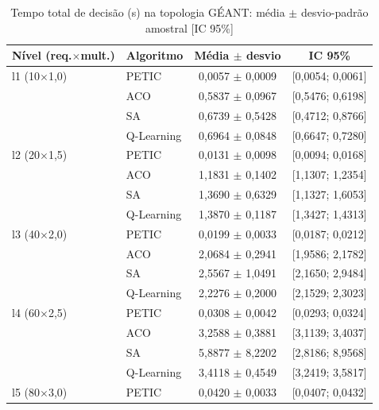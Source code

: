 \begin{table}[htb]
    \centering
    \small
    \caption{Tempo total de decisão (s) na topologia GÉANT: média $\pm$ desvio-padrão amostral [IC 95\%]}
    \label{tab:tempo-geant}
    \begin{tabular}{llcc}
        \hline
        Nível (req.$\times$mult.) & Algoritmo & Média $\pm$ desvio & IC 95\% \\
        \hline
        l1 (10$\times$1,0) & PETIC & 0,0057 $\pm$ 0,0009 & [0,0054; 0,0061] \\
         & ACO & 0,5837 $\pm$ 0,0967 & [0,5476; 0,6198] \\
         & SA & 0,6739 $\pm$ 0,5428 & [0,4712; 0,8766] \\
         & Q-Learning & 0,6964 $\pm$ 0,0848 & [0,6647; 0,7280] \\
        \hline
        l2 (20$\times$1,5) & PETIC & 0,0131 $\pm$ 0,0098 & [0,0094; 0,0168] \\
         & ACO & 1,1831 $\pm$ 0,1402 & [1,1307; 1,2354] \\
         & SA & 1,3690 $\pm$ 0,6329 & [1,1327; 1,6053] \\
         & Q-Learning & 1,3870 $\pm$ 0,1187 & [1,3427; 1,4313] \\
        \hline
        l3 (40$\times$2,0) & PETIC & 0,0199 $\pm$ 0,0033 & [0,0187; 0,0212] \\
         & ACO & 2,0684 $\pm$ 0,2941 & [1,9586; 2,1782] \\
         & SA & 2,5567 $\pm$ 1,0491 & [2,1650; 2,9484] \\
         & Q-Learning & 2,2276 $\pm$ 0,2000 & [2,1529; 2,3023] \\
        \hline
        l4 (60$\times$2,5) & PETIC & 0,0308 $\pm$ 0,0042 & [0,0293; 0,0324] \\
         & ACO & 3,2588 $\pm$ 0,3881 & [3,1139; 3,4037] \\
         & SA & 5,8877 $\pm$ 8,2202 & [2,8186; 8,9568] \\
         & Q-Learning & 3,4118 $\pm$ 0,4549 & [3,2419; 3,5817] \\
        \hline
        l5 (80$\times$3,0) & PETIC & 0,0420 $\pm$ 0,0033 & [0,0407; 0,0432] \\

\end{tabular}
\end{table}
